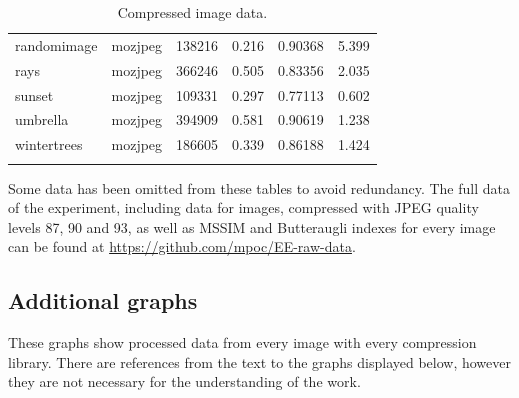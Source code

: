 \documentclass[12pt]{article}
\begin{document}
{\begin{longtable}{llllll}
	randomimage    & mozjpeg          & 138216       & 0.216              & 0.90368   & 5.399                \\
	rays           & mozjpeg          & 366246       & 0.505              & 0.83356   & 2.035                \\
	sunset         & mozjpeg          & 109331       & 0.297              & 0.77113   & 0.602                \\
	umbrella       & mozjpeg          & 394909       & 0.581              & 0.90619   & 1.238                \\
	wintertrees    & mozjpeg          & 186605       & 0.339              & 0.86188   & 1.424               \\ \hline
	\caption{Compressed image data.}
	\label{compressedData}
\end{longtable}}
Some data has been omitted from these tables to avoid redundancy. The full data of the experiment, including data for images, compressed with JPEG quality levels 87, 90 and 93, as well as MSSIM and Butteraugli indexes for every image can be found at \url{https://github.com/mpoc/EE-raw-data}.

\subsection{Additional graphs}
These graphs show processed data from every image with every compression library. There are references from the text to the graphs displayed below, however they are not necessary for the understanding of the work.
\newcommand{\heightOfDiagrams}{140pt}
\newcommand{\spaceBetweenDiagrams}{-0.7cm}
\end{document}
